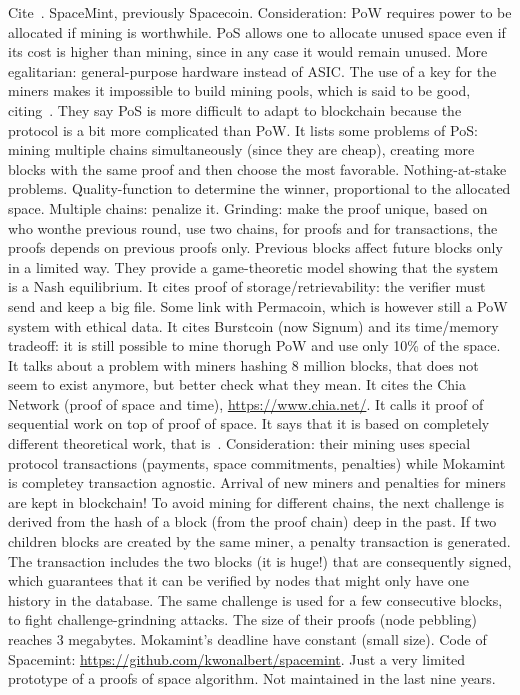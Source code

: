 Cite~\cite{ParkKFGAP18}. SpaceMint, previously Spacecoin. Consideration: PoW requires power
to be allocated if mining is worthwhile. PoS allows one to allocate unused space even if its
cost is higher than mining, since in any case it would remain unused. More egalitarian:
general-purpose hardware instead of ASIC. The use of a key for the miners makes it
impossible to build mining pools, which is said to be good, citing~\cite{MillerKKS15}.
They say PoS is more difficult to adapt to blockchain because the protocol is a bit
more complicated than PoW. It lists some problems of PoS: mining multiple chains simultaneously
(since they are cheap), creating more blocks with the same proof and then choose the most
favorable. Nothing-at-stake problems. Quality-function to determine the winner, proportional
to the allocated space. Multiple chains: penalize it. Grinding: make the proof unique, based
on who wonthe previous round, use
two chains, for proofs and for transactions, the proofs depends on previous proofs only.
Previous blocks affect future blocks only in a limited way.
They provide a game-theoretic model showing that the system is
a Nash equilibrium.
It cites proof of storage/retrievability: the verifier must send and keep a big file.
Some link with Permacoin, which is however still a PoW system with ethical data.
It cites Burstcoin (now Signum) and its time/memory tradeoff: it is still possible
to mine thorugh PoW and use only 10\% of the space.
It talks about a problem with miners hashing 8 million blocks, that does not seem to exist
anymore, but better check what they mean.
It cites the Chia Network (proof of space and time), \url{https://www.chia.net/}.
It calls it proof of sequential work on top of proof of space.
It says that it is based on completely different theoretical work, that is~\cite{AbusalahACKPR17}.
Consideration: their mining uses special protocol transactions
(payments, space commitments, penalties) while Mokamint is completey transaction agnostic.
Arrival of new miners and penalties for miners are kept in blockchain!
To avoid mining for different chains, the next challenge is derived from the hash of a block
(from the proof chain) deep in the past. If two children blocks are created by the same miner,
a penalty transaction is generated. The transaction includes the two blocks (it is huge!)
that are consequently signed, which guarantees that it can be verified by nodes that might
only have one history in the database.
The same challenge is used for a few consecutive blocks, to fight challenge-grindning attacks.
The size of their proofs (node pebbling) reaches 3 megabytes. Mokamint's deadline have constant (small size).
Code of Spacemint: \url{https://github.com/kwonalbert/spacemint}. Just a very limited prototype of a
proofs of space algorithm. Not maintained in the last nine years.

